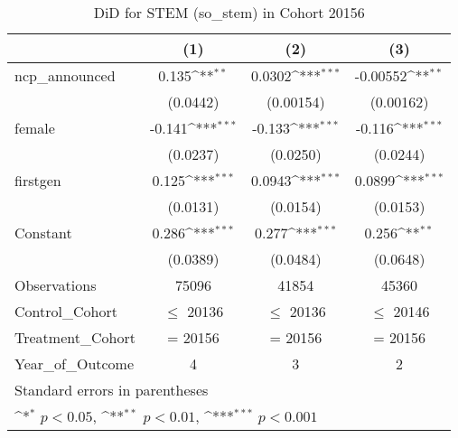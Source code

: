 \begin{table}[htbp]\centering
\def\sym#1{\ifmmode^{#1}\else\(^{#1}\)\fi}
\caption{DiD for STEM (so\_stem) in Cohort 20156}
\begin{tabular}{l*{3}{c}}
\toprule
                &\multicolumn{1}{c}{(1)}         &\multicolumn{1}{c}{(2)}         &\multicolumn{1}{c}{(3)}         \\
\midrule
ncp\_announced   &    0.135\sym{**} &   0.0302\sym{***}& -0.00552\sym{**} \\
                & (0.0442)         &(0.00154)         &(0.00162)         \\
\addlinespace
female          &   -0.141\sym{***}&   -0.133\sym{***}&   -0.116\sym{***}\\
                & (0.0237)         & (0.0250)         & (0.0244)         \\
\addlinespace
firstgen        &    0.125\sym{***}&   0.0943\sym{***}&   0.0899\sym{***}\\
                & (0.0131)         & (0.0154)         & (0.0153)         \\
\addlinespace
Constant        &    0.286\sym{***}&    0.277\sym{***}&    0.256\sym{**} \\
                & (0.0389)         & (0.0484)         & (0.0648)         \\
\midrule
Observations    &    75096         &    41854         &    45360         \\
Control\_Cohort  &$\le$ 20136         &$\le$ 20136         &$\le$ 20146         \\
Treatment\_Cohort&  = 20156         &  = 20156         &  = 20156         \\
Year\_of\_Outcome &        4         &        3         &        2         \\
\bottomrule
\multicolumn{4}{l}{\footnotesize Standard errors in parentheses}\\
\multicolumn{4}{l}{\footnotesize \sym{*} \(p<0.05\), \sym{**} \(p<0.01\), \sym{***} \(p<0.001\)}\\
\end{tabular}
\end{table}
